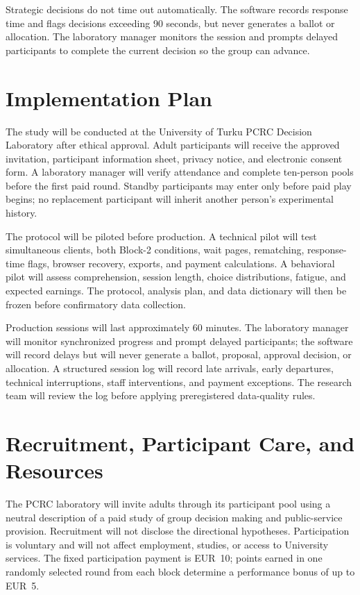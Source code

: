 \documentclass[11pt,a4paper]{article}
\begin{document}
Strategic decisions do not time out automatically. The software records response time and flags decisions exceeding 90 seconds, but never generates a ballot or allocation. The laboratory manager monitors the session and prompts delayed participants to complete the current decision so the group can advance.

\FloatBarrier

\section{Implementation Plan}

The study will be conducted at the University of Turku PCRC Decision Laboratory after ethical approval. Adult participants will receive the approved invitation, participant information sheet, privacy notice, and electronic consent form. A laboratory manager will verify attendance and complete ten-person pools before the first paid round. Standby participants may enter only before paid play begins; no replacement participant will inherit another person's experimental history.

The protocol will be piloted before production. A technical pilot will test simultaneous clients, both Block-2 conditions, wait pages, rematching, response-time flags, browser recovery, exports, and payment calculations. A behavioral pilot will assess comprehension, session length, choice distributions, fatigue, and expected earnings. The protocol, analysis plan, and data dictionary will then be frozen before confirmatory data collection.

Production sessions will last approximately 60 minutes. The laboratory manager will monitor synchronized progress and prompt delayed participants; the software will record delays but will never generate a ballot, proposal, approval decision, or allocation. A structured session log will record late arrivals, early departures, technical interruptions, staff interventions, and payment exceptions. The research team will review the log before applying preregistered data-quality rules.

\section{Recruitment, Participant Care, and Resources}

The PCRC laboratory will invite adults through its participant pool using a neutral description of a paid study of group decision making and public-service provision. Recruitment will not disclose the directional hypotheses. Participation is voluntary and will not affect employment, studies, or access to University services. The fixed participation payment is EUR~10; points earned in one randomly selected round from each block determine a performance bonus of up to EUR~5.
\end{document}
